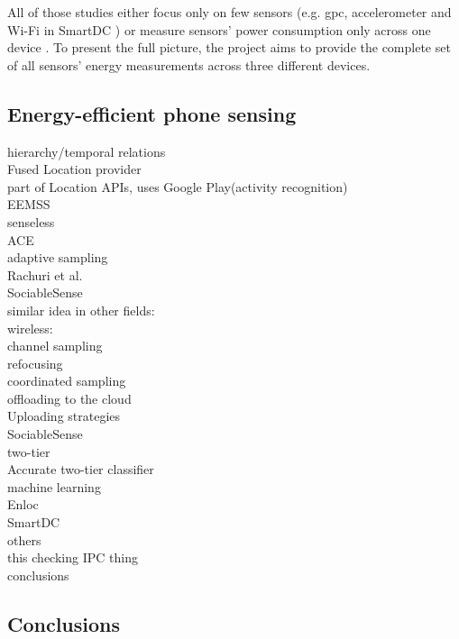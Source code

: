 All of those studies either focus only  on few sensors (e.g. gpc, accelerometer and Wi-Fi in SmartDC \cite{chon:smartdc}) or measure sensors' power consumption only across one device \cite{benabdesslem:senseless}. To present the full picture, the project aims to provide the complete set of all sensors' energy measurements across three different devices. 
	
\subsection{Energy-efficient phone sensing}
hierarchy/temporal relations\\
	Fused Location provider\cite{android:locationapi}\\
		part of Location APIs, uses Google Play(activity recognition)\\
	EEMSS \cite{wang:eemss}\\
	senseless \cite{benabdesslem:senseless}\\
	ACE \cite{nath:ace}\\

adaptive sampling\\
	Rachuri et al. \cite{rachuri:dynamicsensing}\\
	SociableSense \cite{rachuri:socialsense} \\
	similar idea in other fields:\\
		wireless:\\
			channel sampling \cite{deshpande:channeling}\\
			refocusing \cite{deshpande:refocusing}\\
			coordinated sampling \cite{deshpande:coordinated}\\

offloading to the cloud\\
	Uploading strategies \cite{musolesi:offloading}\\
	SociableSense \cite{rachuri:socialsense} \\
	
two-tier\\
	Accurate two-tier classifier \cite{srinivasan:twotier}\\

machine learning\\
	Enloc \cite{constandache:enloc}\\
	SmartDC \cite{chon:smartdc}\\

others\\
	this checking IPC thing\\

conclusions

\subsection{Conclusions}
